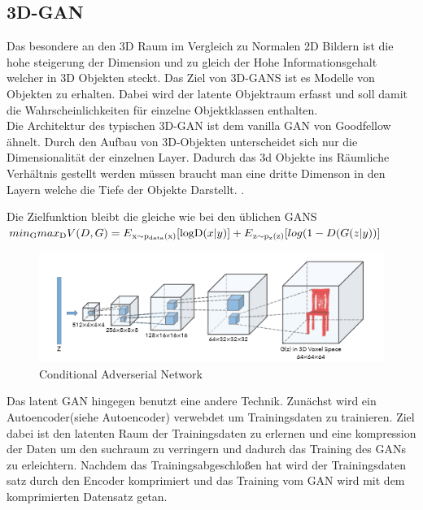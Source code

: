 \documentclass{llncs}
\begin{document}
\subsection{3D-GAN}
Das besondere an den 3D Raum im Vergleich zu Normalen 2D Bildern ist die hohe steigerung der Dimension und zu gleich der Hohe Informationsgehalt welcher in 3D Objekten steckt. Das Ziel von 3D-GANS ist es Modelle von Objekten zu erhalten. Dabei wird der latente Objektraum erfasst und soll damit die Wahrscheinlichkeiten für einzelne Objektklassen enthalten. 
\\
Die Architektur des typischen 3D-GAN ist dem vanilla GAN von Goodfellow ähnelt. Durch den Aufbau von 3D-Objekten unterscheidet sich nur die Dimensionalität der einzelnen Layer. Dadurch das 3d Objekte ins Räumliche Verhältnis gestellt werden müssen braucht man eine dritte Dimenson in den Layern welche die Tiefe der Objekte Darstellt. \cite{3d}. 

Die Zielfunktion bleibt die gleiche wie bei den üblichen GANS 
\begin{math}
min\textsubscript{G} max\textsubscript{D}V(D,G)=E\textsubscript{x$\sim$p\textsubscript{data}(x)}[\log $D$(x|y)]  + E\textsubscript{z$\sim$p\textsubscript{z}(z)}[log(1-D(G(z|y))]           
\end{math}

\begin{figure}[htbp] 
	\centering
	\includegraphics[width=1.2\textwidth]{3dgan.png}
	\caption{Conditional Adverserial Network}
	\label{fig:Bild2}
\end{figure}
\cite{3d}

Das latent GAN hingegen benutzt eine andere Technik. Zunächst wird ein Autoencoder(siehe Autoencoder) verwebdet um Trainingsdaten zu trainieren. Ziel dabei ist den latenten Raum der Trainingsdaten zu erlernen und eine kompression der Daten um den suchraum zu verringern und dadurch das Training des GANs zu erleichtern. Nachdem das Trainingsabgeschloßen hat wird der Trainingsdaten satz durch den Encoder komprimiert und das Training vom GAN wird mit dem komprimierten Datensatz getan. 
\end{document}
